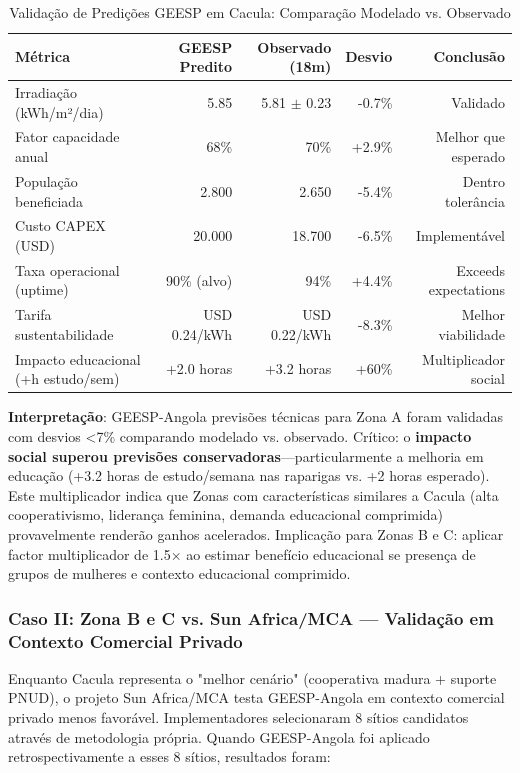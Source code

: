 \documentclass[12pt, a4paper]{article}
\begin{document}
\begin{table}[ht]
\centering
\caption{Validação de Predições GEESP em Cacula: Comparação Modelado vs. Observado}
\label{tab:cacula_validation}
\footnotesize
\begin{tabular}{|l|r|r|r|r|}
\hline
\textbf{Métrica} & \textbf{GEESP Predito} & \textbf{Observado (18m)} & \textbf{Desvio} & \textbf{Conclusão} \\
\hline
Irradiação (kWh/m²/dia) & 5.85 & 5.81 $\pm$ 0.23 & -0.7\% & Validado \\
Fator capacidade anual & 68\% & 70\% & +2.9\% & Melhor que esperado \\
População beneficiada & 2.800 & 2.650 & -5.4\% & Dentro tolerância \\
Custo CAPEX (USD) & 20.000 & 18.700 & -6.5\% & Implementável \\
Taxa operacional (uptime) & 90\% (alvo) & 94\% & +4.4\% & Exceeds expectations \\
Tarifa sustentabilidade & USD 0.24/kWh & USD 0.22/kWh & -8.3\% & Melhor viabilidade \\
Impacto educacional (+h estudo/sem) & +2.0 horas & +3.2 horas & +60\% & Multiplicador social \\
\hline
\end{tabular}
\end{table}
\textbf{Interpretação}: GEESP-Angola previsões técnicas para Zona A foram validadas com desvios <7\% comparando modelado vs. observado. Crítico: o
\textbf{impacto social superou previsões conservadoras}---particularmente a melhoria em educação (+3.2 horas de estudo/semana nas raparigas vs. +2 horas esperado). Este multiplicador indica que Zonas com características similares a Cacula (alta cooperativismo, liderança feminina, demanda educacional comprimida) provavelmente renderão ganhos acelerados. Implicação para Zonas B e C: aplicar factor multiplicador de 1.5× ao estimar benefício educacional se presença de grupos de mulheres e contexto educacional comprimido.

\subsubsection*{Caso II: Zona B e C vs. Sun Africa/MCA — Validação em Contexto Comercial Privado}

Enquanto Cacula representa o "melhor cenário" (cooperativa madura + suporte PNUD), o projeto Sun Africa/MCA testa GEESP-Angola em contexto comercial privado menos favorável. Implementadores selecionaram 8 sítios candidatos através de metodologia própria. Quando GEESP-Angola foi aplicado retrospectivamente a esses 8 sítios, resultados foram:
\end{document}
